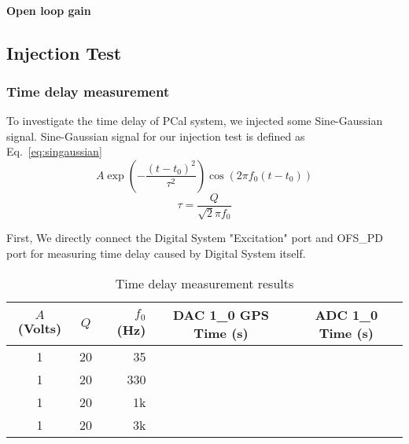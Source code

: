 \paragraph{Open loop gain}


\pagebreak

\subsection{Injection Test}
\subsubsection{Time delay measurement}

To investigate the time delay of PCal system, we injected some Sine-Gaussian signal.
 Sine-Gaussian signal for our injection test is defined as Eq.~\ref{eq:singaussian}
\begin{equation}
\label{eq:singaussian}
    A \exp\left(-\frac{(t-t_0)^2}{\tau^2}\right) \cos ( 2 \pi f_0 (t-t_0))
\end{equation}
\begin{equation*}
   \tau = \frac{Q}{ \sqrt{2} \pi f_0}
\end{equation*}




First, We directly connect the Digital System "Excitation" port and OFS\_PD port for measuring time delay caused by Digital System itself.
\begin{table}[htbp]
   \centering
   \begin{tabular}{ ccrcc } %
      \toprule
      $A$ (Volts) & $Q$    & $f_0$ (Hz) & DAC 1\_0 GPS Time (s) & ADC 1\_0 Time (s) \\
      \midrule
        1 & 20 & 35   &   &\\
        1 & 20 & 330  &   &\\
        1 & 20 & 1k   &   &\\
        1 & 20 & 3k   &   &\\
      \bottomrule
   \end{tabular}
   \caption{Time delay measurement results}
   \label{tab:timedelayDGS}
\end{table}


